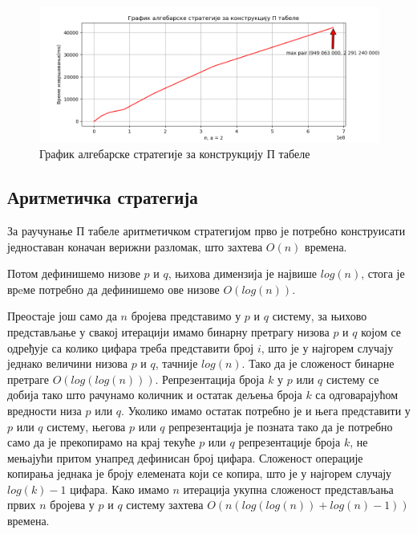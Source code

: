 \documentclass[a4paper]{article}
\begin{document}
\begin{figure}[H]
	\caption{График алгебарске стратегије за конструкцију П табеле}
	\label{fig:algebraic}
	\begin{center}
		\includegraphics[width=\textwidth]{algebraic.png}
	\end{center}
\end{figure}

\subsection{Аритметичка стратегија}

За раучунање П табеле аритметичком стратегијом прво је потребно конструисати једноставан коначан верижни разломак, што захтева $ O(n) $ времена. 

Потом дефинишемо низове $ p $ и $ q $, њихова димензија је највише $ log(n) $, стога је врeме потребно да дефинишемо ове низове $ O(log(n)) $.

Преостаје још само да $ n $ бројева представимо у $ p $ и $ q $ систему, за њихово представљање у свакој итерацији имамо бинарну претрагу низова $ p $ и $ q $ којом се одређује са колико цифара треба представити број $ i $, што је у најгорем случају једнако величини низова $ p $ и $ q $, тачније $ log(n) $. Тако да је сложеност бинарне претраге $ O(log(log(n))) $. Репрезентација броја $ k $ у $ p $ или $ q $ систему се добија тако што рачунамо количник и остатак дељења броја $ k $ са одговарајућом вредности низа $ p $ или $ q $. Уколико имамо остатак потребно је и њега представити у $ p $ или $ q $ систему, његова $ p $ или $ q $ репрезентација је позната тако да је потребно само да је прекопирамо на крај текуће $ p $ или $ q $ репрезентације броја $ k $, не мењајући притом унапред дефинисан број цифара. Сложеност операције копирања једнака је броју елемената који се копира, што је у најгорем случају $ log(k) - 1 $ цифара. Како имамо $ n $ итерација укупна сложеност представљања првих $ n $ бројева у $ p $ и $ q $ систему захтева $ O(n(log(log(n)) + log(n) - 1)) $ времена.
\end{document}
